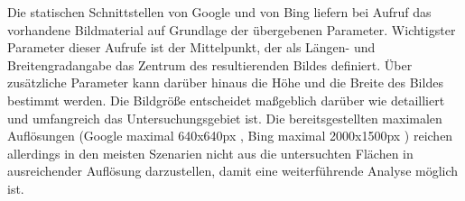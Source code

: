 Die statischen Schnittstellen von Google und von Bing liefern bei Aufruf das vorhandene Bildmaterial auf Grundlage der übergebenen Parameter. Wichtigster Parameter dieser Aufrufe ist der Mittelpunkt, der als Längen- und Breitengradangabe das Zentrum des resultierenden Bildes definiert. Über zusätzliche Parameter kann darüber hinaus die Höhe und die Breite des Bildes bestimmt werden. Die Bildgröße entscheidet maßgeblich darüber wie detailliert und umfangreich das Untersuchungsgebiet ist. Die bereitsgestellten maximalen Auflösungen (Google maximal 640x640px \cite{googleusagelimits}, Bing maximal 2000x1500px \cite{bingstaticmap}) reichen allerdings in den meisten Szenarien nicht aus die untersuchten Flächen in ausreichender Auflösung darzustellen, damit eine weiterführende Analyse möglich ist.\\


